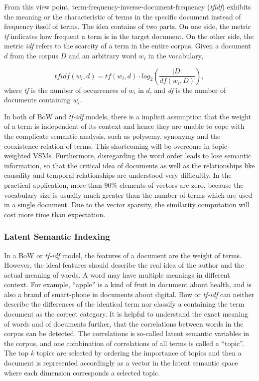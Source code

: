 From this view point, term-frequency-inverse-document-frequency (\textit{tfidf}) exhibits the meaning or the characteristic of terms in the specific document instead of frequency itself of terms. The idea contains of two parts. On one side, the metric \textit{tf} indicates how frequent a term is in the target document. On the other side, the metric \textit{idf} refers to the scarcity of a term in the entire corpus. Given a document $d$ from the corpus $D$ and an arbitrary word $w_i$ in the vocabulary, 

\begin{equation}
    tfidf(w_i, d) = tf(w_i, d) \cdot log_2(\frac{|D|}{df(w_i, D)}), 
\end{equation}
where \textit{tf} is the number of occurrences of $w_i$ in $d$, and \textit{df} is the number of documents containing $w_i$. 

In both of BoW and \textit{tf-idf} models, there is a implicit assumption that the weight of a term is independent of its context and hence they are unable to cope with the complicate semantic analysis, such as polysemy, synonymy and the coexistence relation of terms. This shortcoming will be overcome in topic-weighted VSMs. Furthermore, disregarding the word order leads to lose semantic information, so that the critical idea of documents as well as the relationships like causality and temporal relationships are understood very difficultly. In the practical application, more than $90\%$ elements of vectors are zero, because the vocabulary size is usually much greater than the number of terms which are used in a single document. Due to the vector sparsity, the similarity computation will cost more time than expectation. 

\subsubsection{Latent Semantic Indexing}

In a BoW or \textit{tf-idf}  model, the features of a document are the weight of terms. However, the ideal features should describe the real idea of the author and the actual meaning of words. A word may have multiple meanings in different context. For example, ``apple'' is a kind of fruit in document about health, and is also a brand of smart-phone in documents about digital. Bow or \textit{tf-idf} can neither describe the differences of the identical term nor classify a containing the term document as the correct category. It is helpful to understand the exact meaning of words and of documents further, that the correlations between words in the corpus can be detected. The correlations is so-called latent semantic variables in the corpus, and one combination of correlations of all terms is called a ``topic''. The top $k$ topics are selected by ordering the importance of topics and then a document is represented accordingly as a vector in the latent semantic space where each dimension corresponds a selected topic. 


